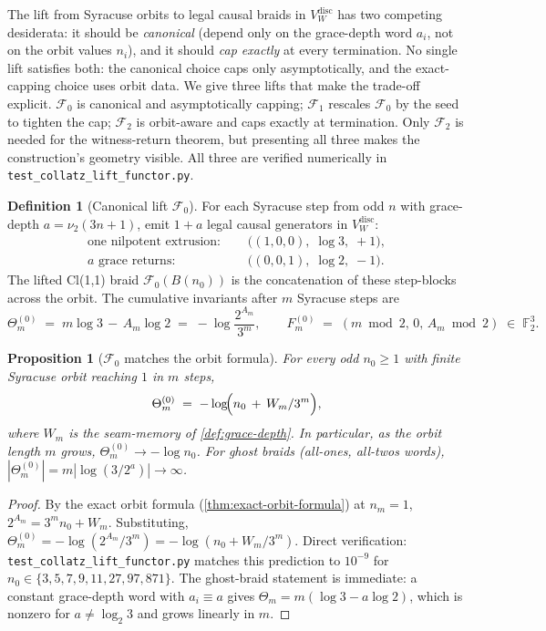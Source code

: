 \documentclass[11pt,a4paper]{article}
\theoremstyle{plain}
\newtheorem{proposition}[theorem]{Proposition}
\theoremstyle{definition}
\newtheorem{definition}[theorem]{Definition}
\theoremstyle{remark}
\numberwithin{equation}{section}
\newcommand{\F}{\mathbb{F}}
\begin{document}
The lift from Syracuse orbits to legal causal braids in
\(V_W^{\mathrm{disc}}\) has two competing desiderata: it should be
\emph{canonical} (depend only on the grace-depth word \(a_i\), not
on the orbit values \(n_i\)), and it should \emph{cap exactly} at
every termination.  No single lift satisfies both: the canonical
choice caps only asymptotically, and the exact-capping choice uses
orbit data.  We give three lifts that make the trade-off explicit.
\(\mathcal{F}_0\) is canonical and asymptotically capping;
\(\mathcal{F}_1\) rescales \(\mathcal{F}_0\) by the seed to tighten
the cap; \(\mathcal{F}_2\) is orbit-aware and caps exactly at
termination.  Only \(\mathcal{F}_2\) is needed for the witness-return
theorem, but presenting all three makes the construction's geometry
visible.  All three are verified numerically in
\texttt{test\_collatz\_lift\_functor.py}.

\begin{definition}[Canonical lift $\mathcal{F}_0$]
\label{def:canonical-lift-F0}
For each Syracuse step from odd $n$ with grace-depth $a=\nu_2(3n+1)$,
emit $1+a$ legal causal generators in $V_W^{\mathrm{disc}}$:
\begin{align*}
\text{one nilpotent extrusion: }\quad
  &\bigl((1,0,0),\;\log 3,\;+1\bigr),\\
\text{$a$ grace returns: }\quad
  &\bigl((0,0,1),\;\log 2,\;-1\bigr).
\end{align*}
The lifted Cl(1,1) braid $\mathcal{F}_0(B(n_0))$ is the concatenation
of these step-blocks across the orbit.  The cumulative invariants
after $m$ Syracuse steps are
\[
  \Theta_m^{(0)}\;=\;m\log 3\,-\,A_m\log 2\;=\;-\log\!\frac{2^{A_m}}{3^m},
  \qquad
  F_m^{(0)}\;=\;(m\bmod 2,\,0,\,A_m\bmod 2)\;\in\;\F_2^3.
\]
\end{definition}

\begin{proposition}[$\mathcal{F}_0$ matches the orbit formula]
\label{prop:F0-matches-orbit-formula}
For every odd $n_0\ge 1$ with finite Syracuse orbit reaching $1$ in
$m$ steps,
\[
  \Theta_m^{(0)}\;=\;-\log\!\Bigl(n_0\,+\,W_m/3^m\Bigr),
\]
where $W_m$ is the seam-memory of \cref{def:grace-depth}.  In
particular, as the orbit length $m$ grows,
$\Theta_m^{(0)}\to-\log n_0$.  For ghost braids (all-ones,
all-twos words), $|\Theta_m^{(0)}|=m|\log(3/2^a)|\to\infty$.
\end{proposition}

\begin{proof}
By the exact orbit formula (\cref{thm:exact-orbit-formula}) at
$n_m=1$, $2^{A_m}=3^m n_0+W_m$.  Substituting,
$\Theta_m^{(0)}=-\log(2^{A_m}/3^m)=-\log(n_0+W_m/3^m)$.  Direct
verification: \texttt{test\_collatz\_lift\_functor.py} matches this
prediction to $10^{-9}$ for $n_0\in\{3,5,7,9,11,27,97,871\}$.  The
ghost-braid statement is immediate: a constant grace-depth word
with $a_i\equiv a$ gives $\Theta_m=m(\log 3-a\log 2)$, which is
nonzero for $a\ne\log_2 3$ and grows linearly in $m$.
\end{proof}
\end{document}

